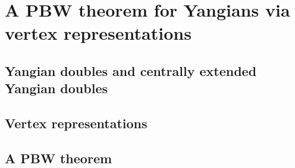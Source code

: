 \section{A PBW theorem for Yangians via vertex representations}
    \subsection{Yangian doubles and centrally extended Yangian doubles}

    \subsection{Vertex representations}

    \subsection{A PBW theorem}